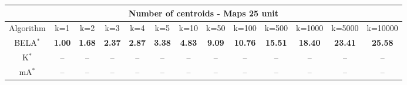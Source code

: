 \begin{tabular}{c|cccccccccccc}\toprule
\multicolumn{13}{c}{Number of centroids - Maps 25 unit}\\ \midrule
Algorithm & k=1 & k=2 & k=3 & k=4 & k=5 & k=10 & k=50 & k=100 & k=500 & k=1000 & k=5000 & k=10000 \\ \midrule
BELA$^*$ & \textbf{1.00} & \textbf{1.68} & \textbf{2.37} & \textbf{2.87} & \textbf{3.38} & \textbf{4.83} & \textbf{9.09} & \textbf{10.76} & \textbf{15.51} & \textbf{18.40} & \textbf{23.41} & \textbf{25.58} \\
K$^*$ & -- & -- & -- & -- & -- & -- & -- & -- & -- & -- & -- & -- \\
mA$^*$ & -- & -- & -- & -- & -- & -- & -- & -- & -- & -- & -- & -- \\ \bottomrule 
\end{tabular}
